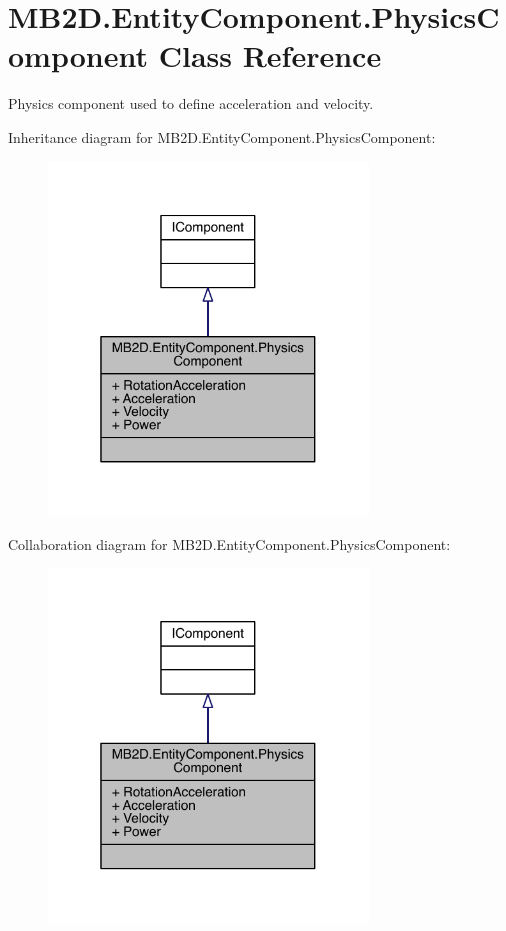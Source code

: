 \hypertarget{class_m_b2_d_1_1_entity_component_1_1_physics_component}{}\section{M\+B2\+D.\+Entity\+Component.\+Physics\+Component Class Reference}
\label{class_m_b2_d_1_1_entity_component_1_1_physics_component}


Physics component used to define acceleration and velocity.  




Inheritance diagram for M\+B2\+D.\+Entity\+Component.\+Physics\+Component\+:\nopagebreak
\begin{figure}[H]
\begin{center}
\leavevmode
\includegraphics[width=241pt]{class_m_b2_d_1_1_entity_component_1_1_physics_component__inherit__graph}
\end{center}
\end{figure}


Collaboration diagram for M\+B2\+D.\+Entity\+Component.\+Physics\+Component\+:\nopagebreak
\begin{figure}[H]
\begin{center}
\leavevmode
\includegraphics[width=241pt]{class_m_b2_d_1_1_entity_component_1_1_physics_component__coll__graph}
\end{center}
\end{figure}
